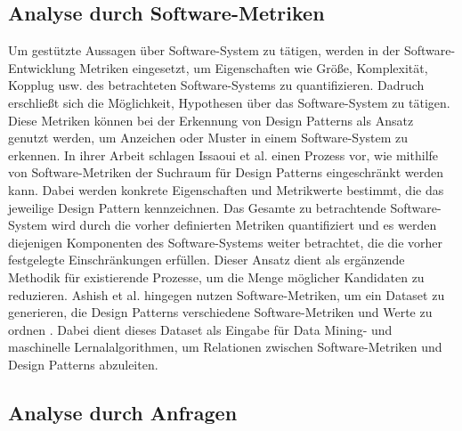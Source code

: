 \documentclass[conference]{IEEEtran}
\begin{document}
\subsection{Analyse durch Software-Metriken}

Um gestützte Aussagen über Software-System zu tätigen, werden in der Software-Entwicklung Metriken eingesetzt, um Eigenschaften wie Größe, Komplexität, Kopplug usw. des betrachteten Software-Systems zu quantifizieren.
Dadruch erschließt sich die Möglichkeit, Hypothesen über das Software-System zu tätigen. Diese Metriken können bei der Erkennung von Design Patterns als Ansatz genutzt werden, um Anzeichen oder Muster in einem Software-System zu erkennen.
In ihrer Arbeit schlagen Issaoui et al. \cite{Issaoui2015} einen Prozess vor, wie mithilfe von Software-Metriken der Suchraum für Design Patterns eingeschränkt werden kann. Dabei werden konkrete Eigenschaften und Metrikwerte bestimmt, die das jeweilige Design Pattern kennzeichnen.
Das Gesamte zu betrachtende Software-System wird durch die vorher definierten Metriken quantifiziert und es werden diejenigen Komponenten des Software-Systems weiter betrachtet, die die vorher festgelegte Einschränkungen erfüllen.
Dieser Ansatz dient als ergänzende Methodik für existierende Prozesse, um die Menge möglicher Kandidaten zu reduzieren.
Ashish et al. hingegen nutzen Software-Metriken, um ein Dataset zu generieren, die Design Patterns verschiedene Software-Metriken und Werte zu ordnen \cite{Ashish2016}. Dabei dient dieses Dataset als Eingabe für Data Mining- und maschinelle Lernalalgorithmen, um Relationen zwischen Software-Metriken und Design Patterns abzuleiten.


\subsection{Analyse durch Anfragen}
\end{document}
